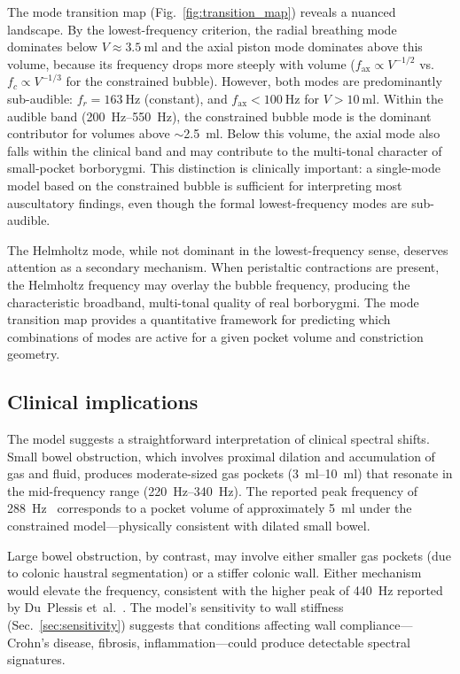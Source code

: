 \documentclass[12pt]{article}
\begin{document}
The mode transition map (Fig.~\ref{fig:transition_map}) reveals a nuanced
landscape.  By the lowest-frequency criterion, the radial breathing mode
dominates below $V \approx \SI{3.5}{\milli\litre}$ and the axial piston mode
dominates above this volume, because its frequency drops more steeply with
volume ($f_\mathrm{ax} \propto V^{-1/2}$ vs.\ $f_c \propto V^{-1/3}$ for
the constrained bubble).  However, both modes are predominantly sub-audible:
$f_r = \SI{163}{\hertz}$ (constant), and $f_\mathrm{ax} < \SI{100}{\hertz}$
for $V > \SI{10}{\milli\litre}$.  Within the audible band
(\SIrange{200}{550}{\hertz}), the constrained bubble mode is the dominant
contributor for volumes above $\sim$\SI{2.5}{\milli\litre}.  Below this
volume, the axial mode also falls within the clinical band and may contribute
to the multi-tonal character of small-pocket borborygmi.  This distinction
is clinically important: a single-mode model based on the constrained
bubble is sufficient for interpreting most auscultatory findings, even though
the formal lowest-frequency modes are sub-audible.

The Helmholtz mode, while not dominant in the lowest-frequency sense,
deserves attention as a secondary mechanism.  When peristaltic contractions
are present, the Helmholtz frequency may overlay the bubble frequency,
producing the characteristic broadband, multi-tonal quality of real
borborygmi.  The mode transition map provides a quantitative framework for
predicting which combinations of modes are active for a given pocket volume
and constriction geometry.

\subsection{Clinical implications}
\label{sec:clinical_implications}

The model suggests a straightforward interpretation of clinical spectral
shifts.  Small bowel obstruction, which involves proximal dilation and
accumulation of gas and fluid, produces moderate-sized gas pockets
(\SIrange{3}{10}{\milli\litre}) that resonate in the mid-frequency range
(\SIrange{220}{340}{\hertz}).  The reported peak frequency of
\SI{288}{\hertz}~\cite{Yoshino1990} corresponds to a pocket volume of
approximately \SI{5}{\milli\litre} under the constrained model---physically
consistent with dilated small bowel.

Large bowel obstruction, by contrast, may involve either smaller gas
pockets (due to colonic haustral segmentation) or a stiffer colonic wall.
Either mechanism would elevate the frequency, consistent with the higher
peak of \SI{440}{\hertz} reported by Du~Plessis et~al.~\cite{DuPlessis2000}.
The model's sensitivity to wall stiffness (Sec.~\ref{sec:sensitivity})
suggests that conditions affecting wall compliance---Crohn's disease, fibrosis,
inflammation---could produce detectable spectral signatures.
\end{document}
